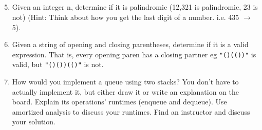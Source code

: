 \documentclass{article}
\begin{document}
\subsection*{}

\begin{enumerate}

\setcounter{enumi}{4}

\item Given an integer n, determine if it is palindromic (12,321 is palindromic, 23 is not) (Hint: Think about how you get the last digit of a number. i.e. 435 $\rightarrow$ 5).

\item Given a string of opening and closing parentheses, determine if it is a valid expression. That is, every opening paren has a closing partner eg \texttt{"()(())"} is valid, but \texttt{"()())(()"} is not.

\item How would you implement a queue using two stacks? You don’t have to actually implement it, but either draw it or write an explanation on the board. Explain its operations’ runtimes (enqueue and dequeue). Use amortized analysis to discuss your runtimes. Find an instructor and discuss your solution.
\end{enumerate}


\clearpage
\end{document}
